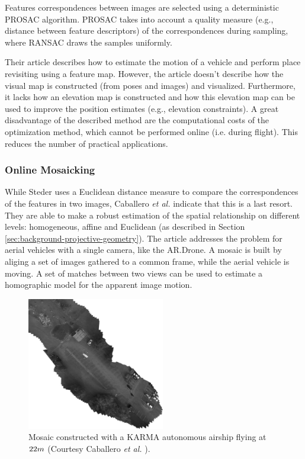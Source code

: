 Features correspondences between images are selected using a deterministic PROSAC \cite{chum2005matching} algorithm.
PROSAC takes into account a quality measure (e.g., distance between feature descriptors) of the correspondences during sampling, where RANSAC draws the samples uniformly.

Their article describes how to estimate the motion of a vehicle and perform place revisiting using a feature map.
However, the article doesn't describe how the visual map is constructed (from poses and images) and visualized.
Furthermore, it lacks how an elevation map is constructed and how this elevation map can be used to improve the position estimates (e.g., elevation constraints).
A great disadvantage of the described method are the computational costs of the optimization method, which cannot be performed online (i.e. during flight). This reduces the number of practical applications.


\subsubsection{Online Mosaicking}
While Steder uses a Euclidean distance measure to compare the correspondences of the features in two images, Caballero \textit{et al.} \cite{caballero2009unmanned} indicate that this is a last resort.
They are able to make a robust estimation of the spatial relationship on different levels: homogeneous, affine and Euclidean (as described in Section \ref{sec:background-projective-geometry}).
The article addresses the problem for aerial vehicles with a single camera, like the AR.Drone.
A mosaic is built by aliging a set of images gathered to a common frame, while the aerial vehicle is moving.
A set of matches between two views can be used to estimate a homographic model for the apparent image motion.

\begin{figure}[htb]
\centering
\includegraphics[width=6cm]{images/Caballero_map.png}
\caption{Mosaic constructed with a KARMA autonomous airship flying at $22\small{m}$ (Courtesy Caballero \textit{et al.} \cite{caballero2009unmanned}).}
\label{fig:Caballero_map}
\end{figure}


